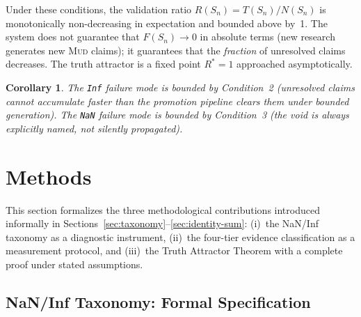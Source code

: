\documentclass[11pt]{article}
\newtheorem{corollary}[theorem]{Corollary}
\theoremstyle{definition}
\theoremstyle{remark}
\newcommand{\NaN}{\texttt{NaN}}
\newcommand{\Inf}{\texttt{Inf}}
\newcommand{\MUD}{\textsc{Mud}}
\begin{document}
Under these conditions, the validation ratio $R(S_n) = T(S_n)/N(S_n)$ is
monotonically non-decreasing in expectation and bounded above by~1.  The system
does not guarantee that $F(S_n) \to 0$ in absolute terms (new research generates
new \MUD{} claims); it guarantees that the \emph{fraction} of unresolved claims
decreases.  The truth attractor is a fixed point $R^* = 1$ approached
asymptotically.

\begin{corollary}
\label{cor:bounds}
The \Inf{} failure mode is bounded by Condition~2 (unresolved claims cannot
accumulate faster than the promotion pipeline clears them under bounded
generation).  The \NaN{} failure mode is bounded by Condition~3 (the void is
always explicitly named, not silently propagated).
\end{corollary}

\section{Methods}
\label{sec:methods}

This section formalizes the three methodological contributions introduced
informally in Sections~\ref{sec:taxonomy}--\ref{sec:identity-sum}: (i)~the
NaN/Inf taxonomy as a diagnostic instrument, (ii)~the four-tier evidence
classification as a measurement protocol, and (iii)~the Truth Attractor Theorem
with a complete proof under stated assumptions.

\subsection{NaN/Inf Taxonomy: Formal Specification}
\label{sec:nan-inf-formal}
\end{document}
